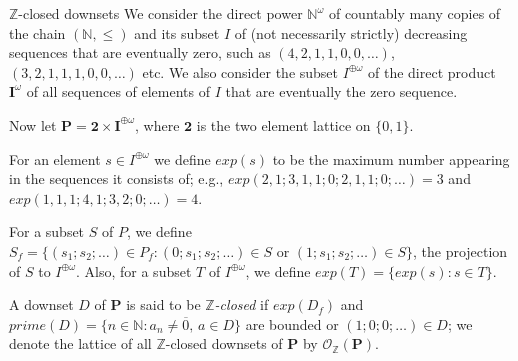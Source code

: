 \documentclass[professionalfont, 10pt]{beamer} %
\theoremstyle{plain}
\theoremstyle{definition}
\newcommand{\m}[1]{{\mathbf {#1} }}
\newcommand{\bb}[1]{\mathbb {#1}}
\begin{document}
\begin{frame}{$\bb{Z}$-closed downsets}
    We consider the direct power $\bb{N}^\omega$ of countably many copies of the chain $(\mathbb{N}, \leq)$ and its subset $I$ of (not necessarily strictly) decreasing sequences that are eventually zero, such as $(4, 2, 1, 1, 0, 0, \dots)$, $(3, 2, 1, 1, 1, 0, 0, \dots)$ etc.
    We also consider  the subset $I^{\oplus \omega}$ of the direct product $\m I^\omega$ of all sequences of elements of $I$ that are eventually the zero sequence.\pause
    
    Now let $\m{P} = \m 2 \times \m I^{\oplus \omega}$, where $\m 2$ is the two element lattice on $\{0,1\}$.\pause
    
    For an element $s \in I^{\oplus \omega}$ we define $exp(s)$ to be the maximum number appearing in the sequences it consists of; e.g., $exp(2, 1; 3, 1, 1; 0; 2, 1, 1; 0; \dots)=3$ and $exp(1, 1, 1; 4, 1; 3, 2; 0; \dots)=4$.\pause
    
    For a subset $S$ of $P$, we define $S_f = \{(s_1; s_2; \dots) \in P_f: (0; s_1; s_2; \dots) \in S \text{ or } (1; s_1; s_2; \dots) \in S\}$, the projection of $S$ to $I^{\oplus \omega}$.
    Also, for a subset $T$ of $I^{\oplus \omega}$, we define $exp(T) =\{exp(s): s \in T\}$.\pause

    A downset $D$ of $\m{P}$ is said to be \emph{$\bb{Z}$-closed} if $exp(D_f)$ and $prime(D) = \{n \in \bb{N}: a_n \neq \overline{0}, \, a \in D\}$ are bounded or $(1; 0; 0; \dots) \in D$; we denote the lattice of all $\bb{Z}$-closed downsets of $\m{P}$ by $\mathcal{O}_{\bb{Z}}(\m{P})$.
\end{frame}
\end{document}
